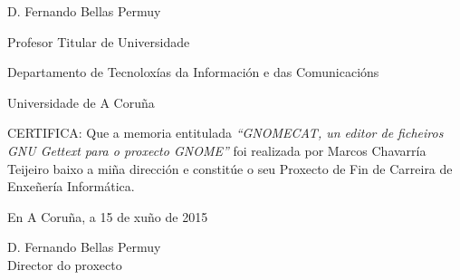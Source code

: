 %
%

\begin{center}
	\begin{minipage}[t][6cm][l]{.8\textwidth}
		\begin{center}
			D. {\sc Fernando Bellas Permuy}

			Profesor Titular de Universidade

			Departamento de Tecnoloxías da Información e das Comunicacións

			Universidade de A Coruña
		\end{center}
	\end{minipage}
\end{center}

CERTIFICA:
Que a memoria entitulada {\it ``GNOMECAT, un editor de ficheiros GNU Gettext para o proxecto GNOME''} foi realizada por {\sc Marcos Chavarría Teijeiro} baixo a miña dirección e constitúe o seu Proxecto de Fin de Carreira de Enxeñería Informática.

\vspace{5cm}

En A Coruña, a 15 de xuño de 2015

\vspace{3cm}

\begin{center}
	\begin{minipage}[t][4cm][l]{.5\textwidth}
	D. {\sc Fernando Bellas Permuy}
	\\
	Director do proxecto
	\end{minipage}
\end{center}
